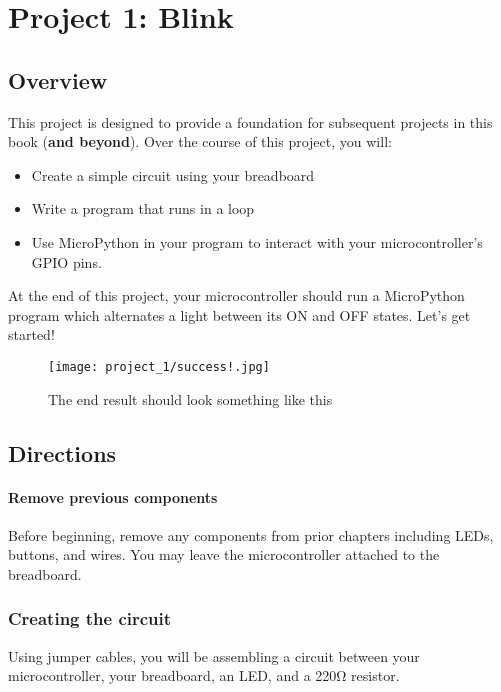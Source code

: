 \chapter{Project 1: Blink}

\section{Overview}
This project is designed to provide a foundation for subsequent projects in this book (\textbf{and beyond}).
Over the course of this project, you will:
\begin{itemize}
    \item Create a simple circuit using your breadboard
    \item Write a program that runs in a loop
    \item Use MicroPython in your program to interact with your microcontroller's GPIO pins.
\end{itemize}
At the end of this project, your microcontroller should run a MicroPython program which alternates a
light between its ON and OFF states. Let's get started!
\begin{figure}[H]
\centering
    \texttt{[image: project\_1/success!.jpg]}
    \caption{The end result should look something like this}
\end{figure}

\pagebreak

\section{Directions}

\subsubsection{Remove previous components}
Before beginning, remove any components from prior chapters including LEDs, buttons, and wires. You may leave the
microcontroller attached to the breadboard.

\subsection{Creating the circuit}
Using jumper cables, you will be assembling a circuit between your microcontroller, your breadboard,
an LED, and a 220\si{\ohm} resistor.


